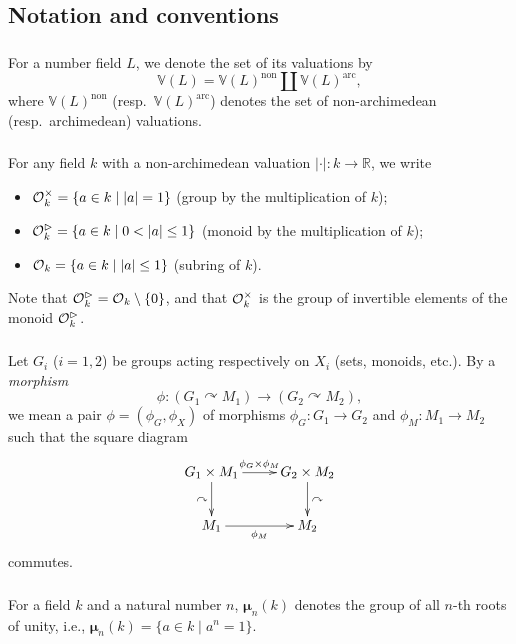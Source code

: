 \documentclass[12pt, reqno, a4paper]{amsart}
\def\longto{\longrightarrow}
\def\acton{\curvearrowright} %
\def\bR{\mathbb{R}} %
\def\bV{\mathbb{V}}
\def\bmu{\bm{\mu}}
\def\non{\mathrm{non}}
\def\arc{\mathrm{arc}}
\begin{document}
\subsection{Notation and conventions}\label{sub:NotationConventions}

\subsubsection{}\label{subsub:NotationPlaces}
For a number field \(L\), we denote the set of its valuations by
  $$
 {\textstyle  \bV(L)=\bV(L)^{\non}\coprod\bV(L)^{\arc}}, 
  $$
where \(\bV(L)^{\non}\) (resp.\ \(\bV(L)^{\arc}\)) denotes the set of non-archimedean (resp.\ archimedean) valuations.

\subsubsection{}
For any field $k$ with a non-archimedean valuation $|\cdot|\colon k\to\bR$, we write
  \begin{itemize}
      \item $\OOx_k=\{a\in k\mid|a|=1\}$ (group by the multiplication of $k$);
      \item $\OOt_k=\{a\in k\mid 0<|a|\leq 1\}$ (monoid by the multiplication of $k$);
      \item $\OO_k=\{a\in k\mid|a|\leq 1\}$ (subring of $k$).
  \end{itemize}
Note that $\OOt_k=\OO_k\setminus\{0\}$, and that $\OOx_k$ is the group of invertible elements of the monoid $\OOt_k$.

\subsubsection{}\label{subsub:morphismBetweenActions}
Let $G_i$ ($i=1,2$) be groups acting respectively on $X_i$ (sets, monoids, etc.). By a {\it morphism}
  $$
  \phi\colon (G_1\acton M_1)\longto(G_2\acton M_2),
  $$
  we mean a pair $\phi=(\phi_G,\phi_X)$ of morphisms $\phi_G\colon G_1\to G_2$ and $\phi_M\colon M_1\to M_2$ such that the square diagram 
  $$
  \xymatrix{G_1\times M_1\ar[r]^{\phi_G\times\phi_M}\ar[d]_{\acton}&G_2\times M_2\ar[d]^{\acton}\\ M_1\ar[r]_{\phi_M}&M_2}
  $$
  commutes.
  
\subsubsection{}\label{subsub:rootOfUnity}
For a field $k$ and a natural number $n$, $\bmu_n(k)$ denotes the group of all $n$-th roots of unity, i.e., $\bmu_n(k)=\{a\in k\mid a^n=1\}$.
\end{document}
